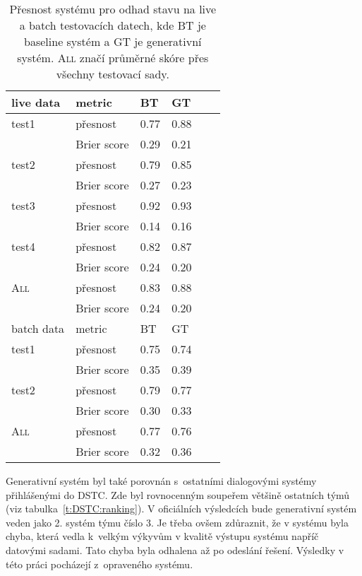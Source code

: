 \begin{table}[htb]
\begin{center}
\begin{tabular}{|l|l|l|l|l|l|}
  \hline
live data & metric      & BT & GT \\
\hline
test1 & přesnost    & 0.77 & 0.88 \\
        & Brier score & 0.29 & 0.21 \\
\hline
test2 & přesnost    & 0.79 & 0.85 \\
        & Brier score & 0.27 & 0.23 \\
\hline
test3  & přesnost    & 0.92 & 0.93 \\
        & Brier score & 0.14 & 0.16 \\
\hline
test4  & přesnost    & 0.82 & 0.87 \\
        & Brier score & 0.24 & 0.20 \\
\hline
\textsc{All}    & přesnost    & 0.83 & 0.88 \\
        & Brier score & 0.24 & 0.20 \\
\hline
\hline
batch data & metric      & BT & GT \\
\hline
test1 & přesnost    & 0.75 & 0.74 \\
        & Brier score & 0.35 & 0.39 \\
\hline
test2 & přesnost    & 0.79 & 0.77 \\
        & Brier score & 0.30 & 0.33 \\
\hline
\textsc{All}    & přesnost    & 0.77 & 0.76 \\
        & Brier score & 0.32 & 0.36 \\
\hline
\end{tabular}
\end{center}
\caption{Přesnost systému pro odhad stavu na live a batch testovacích datech, kde BT je baseline systém a GT je generativní systém. \textsc{All} značí průměrné skóre přes všechny testovací sady.}
\label{t:all:datasets}
\end{table}

Generativní systém byl také porovnán s~ostatními dialogovými systémy přihlášenými do DSTC.
Zde byl rovnocenným soupeřem většině ostatních týmů (viz tabulka~\ref{t:DSTC:ranking}).
V oficiálních výsledcích bude generativní systém veden jako 2. systém týmu číslo 3.
Je třeba ovšem zdůraznit, že v systému byla chyba, která vedla k~velkým výkyvům v kvalitě výstupu systému napříč datovými sadami.
Tato chyba byla odhalena až po odeslání řešení.
Výsledky v této práci pocházejí z~opraveného systému.

